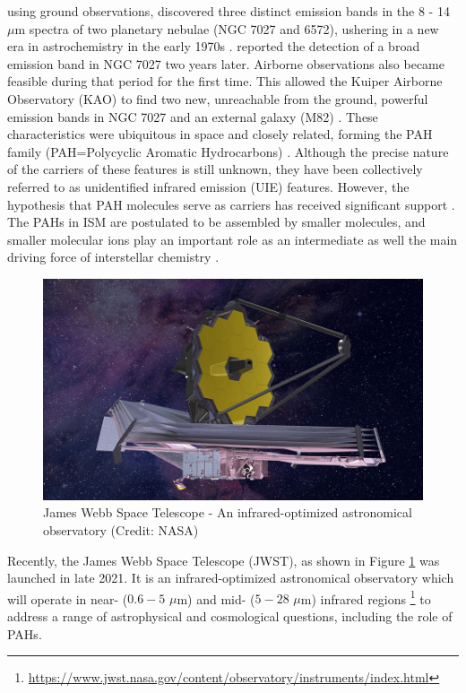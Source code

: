 \citet{gillett_8_1973} using ground observations, discovered three distinct emission bands in the 8 - 14 $\mu$m spectra of two planetary nebulae (NGC 7027 and 6572), ushering in a new era in astrochemistry in the early 1970s \cite{li_spitzers_2020}. \citet{merrill_2_1975} reported the detection of a broad emission band in NGC 7027 two years later. Airborne observations also became feasible during that period for the first time. This allowed the Kuiper Airborne Observatory (KAO) to find two new, unreachable from the ground, powerful emission bands in NGC 7027 and an external galaxy (M82) \cite{russell_4_1977, willner_2_1977}. These characteristics were ubiquitous in space and closely related, forming the PAH family (PAH=Polycyclic Aromatic Hydrocarbons) \cite{li_spitzers_2020}. Although the precise nature of the carriers of these features is still unknown, they have been collectively referred to as unidentified infrared emission (UIE) features. However, the hypothesis that PAH molecules serve as carriers has received significant support \cite{leger_identification_1984, allamandola_polycyclic_1985}. The PAHs in ISM are postulated to be 
assembled by smaller molecules, and smaller molecular ions play an important role as an intermediate 
as well the main driving force of interstellar chemistry \cite{smith_ion_1992,herbst_dense_1988,CGP2015}.

\begin{figure}[!htb]
    \centering
    \includegraphics[scale=0.3]{figures/intro/JWST.jpg}
    \caption{James Webb Space Telescope - An infrared-optimized astronomical observatory (Credit: NASA)}
    \label{fig:JWST}
\end{figure}

Recently, the James Webb Space Telescope (JWST), as shown in Figure \ref{fig:JWST} was launched in late 2021. It is an infrared-optimized astronomical observatory which will operate in near- ($0.6 - 5$ $\mu$m) and mid- ($5 - 28$ $\mu$m) infrared regions \footnote{\url{https://www.jwst.nasa.gov/content/observatory/instruments/index.html}} to address a range of astrophysical and cosmological questions, including the role of PAHs.

